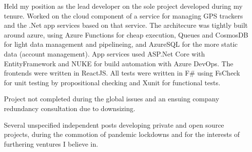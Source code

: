 \documentclass[a4paper]{cv}
\begin{document}
\begin{minipage}[t]{0.66\textwidth}
\sectionspace %

\end{minipage} %

\begin{minipage}[t]{0.8\textwidth}\centering


\vspace{\topsep} %
\begin{tightitemize}
\item\small Held my position as the lead developer on the sole project developed during my tenure. Worked on the cloud component of a service for managing GPS trackers and the .Net app services based on that service. The architecure was tightly built around azure, using Azure Functions for cheap execution, Queues and CosmosDB for light data management and pipelineing, and AzureSQL for the more static data (account management). App services used ASP.Net Core with EntityFramework and NUKE for build automation with Azure DevOps. The frontends were written in ReactJS. All tests were written in F\# using FsCheck for unit testing by propositional checking and Xunit for functional tests.
\item\small Project not completed during the global issues and an ensuing company redundancy consultation due to downsizing.
\end{tightitemize}

\sectionspace %


\vspace{\topsep} %
\begin{tightitemize}
\item\small Several unspecified independent posts developing private and open source projects, during the commotion of pandemic lockdowns and for the interests of furthering ventures I believe in.
\end{tightitemize}

\sectionspace %

\end{minipage} %
\end{document}
